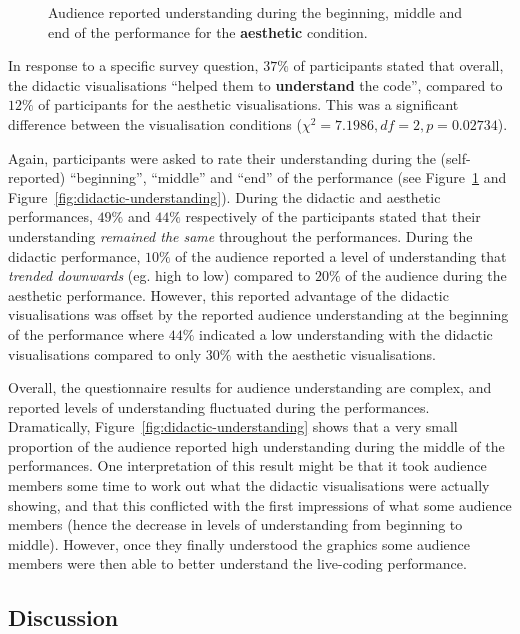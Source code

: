 \documentclass{sig-alternate}
\begin{document}
\begin{figure}
\centering
{}
\caption{Audience reported understanding during the beginning, middle
  and end of the performance for the \textbf{aesthetic} condition.}
\label{fig:aesthetic-understanding}
\end{figure}

In response to a specific survey question, $37\%$ of participants
stated that overall, the didactic visualisations ``helped them to
\textbf{understand} the code'', compared to $12\%$ of participants for the
aesthetic visualisations. This was a significant difference between
the visualisation conditions ($\chi^2=7.1986,df=2,p=0.02734$).

Again, participants were asked to rate their understanding during the
(self-reported) ``beginning'', ``middle'' and ``end'' of the
performance (see Figure~\ref{fig:aesthetic-understanding} and
Figure~\ref{fig:didactic-understanding}). During the didactic and
aesthetic performances, $49\%$ and $44\%$ respectively of the
participants stated that their understanding \emph{remained the same}
throughout the performances. During the didactic performance, $10\%$
of the audience reported a level of understanding that \emph{trended
  downwards} (eg. high to low) compared to $20\%$ of the audience
during the aesthetic performance. However, this reported advantage of
the didactic visualisations was offset by the reported audience
understanding at the beginning of the performance where $44\%$
indicated a low understanding with the didactic visualisations
compared to only $30\%$ with the aesthetic visualisations. 

Overall, the questionnaire results for audience understanding are
complex, and reported levels of understanding fluctuated during the
performances. Dramatically, Figure~\ref{fig:didactic-understanding}
shows that a very small proportion of the audience reported high
understanding during the middle of the performances. One
interpretation of this result might be that it took audience members
some time to work out what the didactic visualisations were actually
showing, and that this conflicted with the first impressions of what
some audience members (hence the decrease in levels of understanding
from beginning to middle). However, once they finally understood the
graphics some audience members were then able to better understand the
live-coding performance.

\subsection{Discussion}
\end{document}

